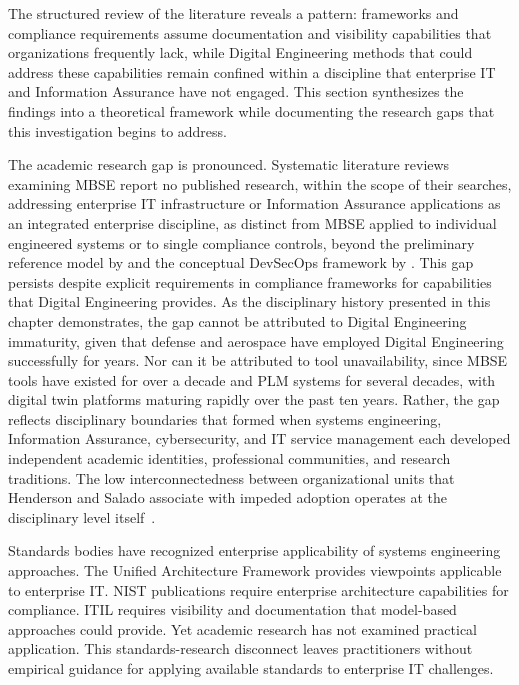 The structured review of the literature reveals a pattern: frameworks and compliance requirements assume documentation and visibility capabilities that organizations frequently lack, while Digital Engineering methods that could address these capabilities remain confined within a discipline that enterprise IT and Information Assurance have not engaged. This section synthesizes the findings into a theoretical framework while documenting the research gaps that this investigation begins to address.

The academic research gap is pronounced. Systematic literature reviews examining MBSE report no published research, within the scope of their searches, addressing enterprise IT infrastructure or Information Assurance applications as an integrated enterprise discipline, as distinct from MBSE applied to individual engineered systems or to single compliance controls, beyond the preliminary reference model by \textcite{Bonar_Hastings_2024} and the conceptual DevSecOps framework by \textcite{CMU_SEI_DevSecOps_2023}. This gap persists despite explicit requirements in compliance frameworks for capabilities that Digital Engineering provides. As the disciplinary history presented in this chapter demonstrates, the gap cannot be attributed to Digital Engineering immaturity, given that defense and aerospace have employed Digital Engineering successfully for years. Nor can it be attributed to tool unavailability, since MBSE tools have existed for over a decade and PLM systems for several decades, with digital twin platforms maturing rapidly over the past ten years. Rather, the gap reflects disciplinary boundaries that formed when systems engineering, Information Assurance, cybersecurity, and IT service management each developed independent academic identities, professional communities, and research traditions. The low interconnectedness between organizational units that Henderson and Salado associate with impeded adoption operates at the disciplinary level itself~\parencite{Henderson_Salado_2024_Org}.

Standards bodies have recognized enterprise applicability of systems engineering approaches. The Unified Architecture Framework provides viewpoints applicable to enterprise IT\@. NIST publications require enterprise architecture capabilities for compliance. ITIL requires visibility and documentation that model-based approaches could provide. Yet academic research has not examined practical application. This standards-research disconnect leaves practitioners without empirical guidance for applying available standards to enterprise IT challenges.

